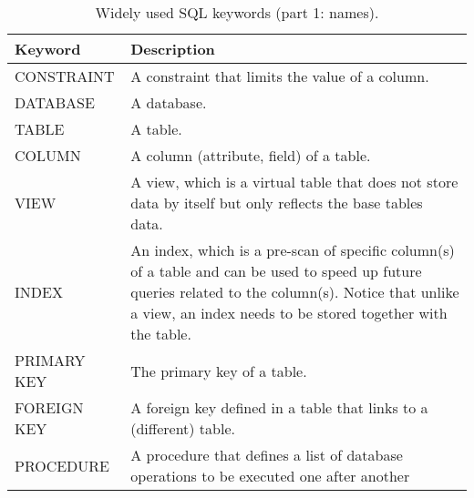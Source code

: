 \begin{table}
	\centering \caption{Widely used SQL keywords (part 1: names).}\label{ch:db:tab:sqlkeywords1}
	\begin{tabularx}{\textwidth}{lX}
		\hline
		Keyword & Description \\ \hline
		CONSTRAINT & A constraint that limits the value of a column. \\ \hdashline
		DATABASE & A database. \\ \hdashline
		TABLE & A table. \\ \hdashline
		COLUMN & A column (attribute, field) of a table. \\ \hdashline
		VIEW & A view, which is a virtual table that does not store data by itself but only reflects the base tables data. \\ \hdashline
		INDEX & An index, which is a pre-scan of specific column(s) of a table and can be used to speed up future queries related to the column(s). Notice that unlike a view, an index needs to be stored together with the table. \\ \hdashline
		PRIMARY KEY & The primary key of a table. \\ \hdashline
		FOREIGN KEY & A foreign key defined in a table that links to a (different) table. \\ \hdashline
		PROCEDURE & A procedure that defines a list of database operations to be executed one after another \\ \hline
	\end{tabularx}
\end{table}

